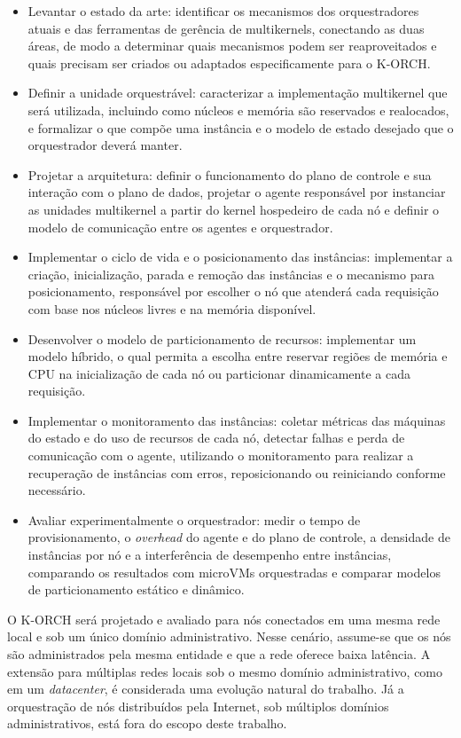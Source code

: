 \documentclass[12pt]{article}
\begin{document}
\begin{itemize}
  \item Levantar o estado da arte: identificar os mecanismos dos orquestradores atuais e das ferramentas de gerência
  de multikernels, conectando as duas áreas, de modo a determinar quais mecanismos podem ser reaproveitados e quais
  precisam ser criados ou adaptados especificamente para o K-ORCH.
  \item Definir a unidade orquestrável: caracterizar a implementação multikernel que será utilizada, incluindo como
  núcleos e memória são reservados e realocados, e formalizar o que compõe uma instância e o modelo de estado desejado
  que o orquestrador deverá manter.
  \item Projetar a arquitetura: definir o funcionamento do plano de controle e sua interação com o plano de dados,
  projetar o agente responsável por instanciar as unidades multikernel a partir do kernel hospedeiro de cada nó
  e definir o modelo de comunicação entre os agentes e orquestrador.
  \item Implementar o ciclo de vida e o posicionamento das instâncias: implementar a criação, inicialização, parada e
  remoção das instâncias e o mecanismo para posicionamento, responsável por escolher o nó que atenderá
  cada requisição com base nos núcleos livres e na memória disponível.
  \item Desenvolver o modelo de particionamento de recursos: implementar um modelo híbrido, o qual permita a escolha entre reservar regiões de memória e CPU na
  inicialização de cada nó ou particionar dinamicamente a cada requisição.
  \item Implementar o monitoramento das instâncias: coletar métricas das máquinas do estado e do uso de recursos de cada nó,
  detectar falhas e perda de comunicação com o agente, utilizando o monitoramento para realizar a recuperação de instâncias com erros,
  reposicionando ou reiniciando conforme necessário.
  \item Avaliar experimentalmente o orquestrador: medir o tempo de provisionamento, o \textit{overhead} do agente e do
  plano de controle, a densidade de instâncias por nó e a interferência de desempenho entre instâncias, comparando os
  resultados com microVMs orquestradas e comparar modelos de particionamento estático e dinâmico.
\end{itemize}

O K-ORCH será projetado e avaliado para nós conectados em uma mesma rede local e sob um único domínio administrativo.
Nesse cenário, assume-se que os nós são administrados pela mesma entidade e que a rede oferece baixa latência.
A extensão para múltiplas redes locais sob o mesmo domínio administrativo, como em um \textit{datacenter}, é considerada
uma evolução natural do trabalho.
Já a orquestração de nós distribuídos pela Internet, sob múltiplos domínios administrativos, está fora do
escopo deste trabalho.
\end{document}
